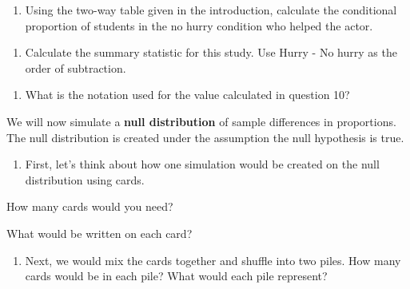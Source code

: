 \documentclass[
]{report}
\providecommand{\tightlist}{%
  \setlength{\itemsep}{0pt}\setlength{\parskip}{0pt}}
\newcommand{\rgi}{\hspace{24pt}}  %
\begin{document}
\vspace{.3in}

\begin{enumerate}
\def\labelenumi{\arabic{enumi}.}
\setcounter{enumi}{8}
\tightlist
\item
  Using the two-way table given in the introduction, calculate the conditional proportion of students in the no hurry condition who helped the actor.
\end{enumerate}

\vspace{.3in}

\begin{enumerate}
\def\labelenumi{\arabic{enumi}.}
\setcounter{enumi}{9}
\tightlist
\item
  Calculate the summary statistic for this study. Use Hurry - No hurry as the order of subtraction.
\end{enumerate}

\vspace{0.4in}

\begin{enumerate}
\def\labelenumi{\arabic{enumi}.}
\setcounter{enumi}{10}
\tightlist
\item
  What is the notation used for the value calculated in question 10?
\end{enumerate}

\vspace{0.1in}

We will now simulate a \textbf{null distribution} of sample differences in proportions. The null distribution is created under the assumption the null hypothesis is true.

\begin{enumerate}
\def\labelenumi{\arabic{enumi}.}
\setcounter{enumi}{11}
\tightlist
\item
  First, let's think about how one simulation would be created on the null distribution using cards.
\end{enumerate}

\rgi How many cards would you need?
\vspace{0.1in}

\rgi What would be written on each card?

\vspace{0.5in}

\begin{enumerate}
\def\labelenumi{\arabic{enumi}.}
\setcounter{enumi}{12}
\tightlist
\item
  Next, we would mix the cards together and shuffle into two piles. How many cards would be in each pile? What would each pile represent?
\end{enumerate}
\end{document}
